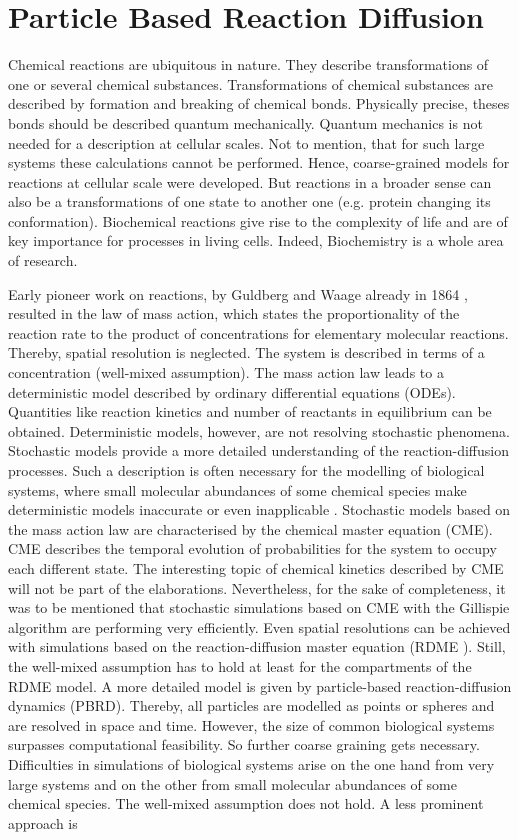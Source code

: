 \documentclass[
  a4paper,BCOR10mm,oneside,
  headsepline,footsepline,%
  fleqn,openbib
]{scrbook}
\begin{document}
\chapter{Particle Based Reaction Diffusion }
Chemical reactions are ubiquitous in nature. They describe transformations of one or several chemical substances. Transformations of chemical substances are described by formation and breaking of chemical bonds. Physically precise, theses bonds should be described quantum mechanically. Quantum mechanics is not needed for a description at cellular scales. Not to mention, that for such large systems these calculations cannot be performed. Hence, coarse-grained models for reactions at cellular scale were developed. But reactions in a broader sense can also be a transformations of one state to another one (e.g. protein changing its conformation). Biochemical reactions give rise to the complexity of life and are of key importance for processes in living cells. Indeed, Biochemistry is a whole area of research.\par Early pioneer work on reactions, by Guldberg and Waage already in 1864 \cite{Waage1986}, resulted in the law of mass action, which states the proportionality of the reaction rate to the product of concentrations for elementary molecular reactions. Thereby, spatial resolution is neglected. The system is described in terms of a concentration (well-mixed assumption). The mass action law leads to a deterministic model described by ordinary differential equations (ODEs). Quantities like reaction kinetics and number of reactants in equilibrium can be obtained. Deterministic models, however, are not resolving stochastic phenomena. Stochastic models provide a more detailed understanding of the reaction-diffusion processes. Such a description is often necessary for the modelling of biological systems, where small molecular abundances of some chemical species make deterministic models inaccurate or even inapplicable \cite{0704.1908}. Stochastic models based on the mass action law are characterised by the chemical master equation (CME). CME describes the temporal evolution of probabilities for the system to occupy each different state. The interesting topic of chemical kinetics described by CME will not be part of the elaborations. Nevertheless, for the sake of completeness, it was to be mentioned that stochastic simulations based on CME with the Gillispie algorithm \cite{Gillespie1977} are performing very efficiently. Even spatial resolutions can be achieved with simulations based on the reaction-diffusion master equation (RDME \cite{Winkelmann2016}). Still, the well-mixed assumption has to hold at least for the compartments of the RDME model. A more detailed model is given by particle-based reaction-diffusion dynamics (PBRD)\cite{Schneberg2014,Gruenert2010}. Thereby, all particles are modelled as points or spheres and are resolved in space and time. However, the size  of common biological systems surpasses computational feasibility. So further coarse graining gets necessary. Difficulties in simulations of biological systems arise on the one hand from very large systems and on the other from small molecular abundances of some chemical species. The well-mixed assumption does not hold.  A less prominent approach is 
\end{document}

